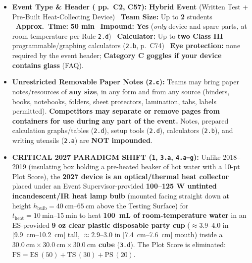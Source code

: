 \begin{rulebox}
\begin{itemize}
  \item \textbf{Event Type \& Header ( pp.\ C2, C57):} \textbf{Hybrid Event} (Written Test + Pre-Built Heat-Collecting Device) \textbar\ \textbf{Team Size:} Up to \textbf{2} students \textbar\ \textbf{Approx.\ Time:} \textbf{50 min} \textbar\ \textbf{Impound:} \textbf{Yes} (\emph{only} device and spare parts, at room temperature per Rule \texttt{2.d}) \textbar\ \textbf{Calculator:} Up to \textbf{two Class III} programmable/graphing calculators (\texttt{2.b}, p.\ C74) \textbar\ \textbf{Eye protection:} none required by the event header; \textbf{Category C goggles if your device contains glass} (FAQ).
  \item \textbf{Unrestricted Removable Paper Notes (\texttt{2.c}):} Teams may bring paper notes/resources of \textbf{any size}, in any form and from any source (binders, books, notebooks, folders, sheet protectors, lamination, tabs, labels permitted). \textbf{Competitors may separate or remove pages from containers for use during any part of the event.} Notes, prepared calculation graphs/tables (\texttt{2.d}), setup tools (\texttt{2.d}), calculators (\texttt{2.b}), and writing utensils (\texttt{2.a}) are \textbf{NOT impounded}.
  \item \textbf{CRITICAL 2027 PARADIGM SHIFT (\texttt{1}, \texttt{3.a}, \texttt{4.a--g}):} Unlike 2018--2019 (insulating box holding a pre-heated beaker of hot water with a 10-pt Plot Score), the \textbf{2027 device is an optical/thermal heat collector} placed under an Event Supervisor-provided \textbf{100--125 W untinted incandescent/IR heat lamp bulb} (mounted facing straight down at height $h_{\mathrm{bulb}} = \SIrange{40}{65}{\centi\meter}$ above the Testing Surface) for $t_{\mathrm{heat}} = \SIrange{10}{15}{\minute}$ to heat \textbf{\SI{100}{\milli\liter} of room-temperature water} in an ES-provided \textbf{9 oz clear plastic disposable party cup} ($\approx 3.9\text{--}4.0\text{ in}$ [\SIrange{9.9}{10.2}{\centi\meter}] tall, $\approx 2.9\text{--}3.0\text{ in}$ [\SIrange{7.4}{7.6}{\centi\meter}] mouth) inside a \textbf{$\SI{30.0}{\centi\meter} \times \SI{30.0}{\centi\meter} \times \SI{30.0}{\centi\meter}$ cube} (\texttt{3.d}). The Plot Score is eliminated: $\mathrm{FS} = \mathrm{ES\,(50)} + \mathrm{TS\,(30)} + \mathrm{PS\,(20)}$.
\end{itemize}
\end{rulebox}

